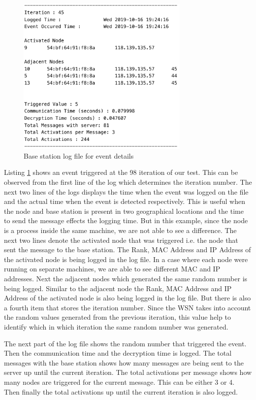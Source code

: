 \documentclass[conference]{IEEEtran}
\begin{document}
	\begin{figure}[!h]
		\centering
		\includegraphics[width=3.3in,keepaspectratio]{logE}
		\caption{Base station log file for event details}
		\label{lst:log1}
	\end{figure}	
	Listing \ref{lst:log1} shows an event triggered at the 98 iteration of our test. This can be observed from the first line of the log which determines the iteration number. The next two lines of the logs displays the time when the event was logged on the file and the actual time when the event is detected respectively. This is useful when the node and base station is present in two geographical locations and the time to send the message effects the logging time. But in this example, since the node is a process inside the same machine, we are not able to see a difference. The next two lines denote the activated node that was triggered i.e. the node that sent the message to the base station. The Rank, MAC Address and IP Address of the activated node is being logged in the log file. In a case where each node were running on separate machines, we are able to see different MAC and IP addresses. Next the adjacent nodes which generated the same random number is being logged. Similar to the adjacent node the Rank, MAC Address and IP Address of the activated node is also being logged in the log file. But there is also a fourth item that stores the iteration number. Since the WSN takes into account the random values generated from the previous iteration, this value help to identify which in which iteration the same random number was generated.
	
	The next part of the log file shows the random number that triggered the event. Then the communication time and the decryption time is logged. The total messages with the base station shows how many messages are being sent to the server up until the current iteration. The total activations per message shows how many nodes are triggered for the current message. This can be either 3 or 4. Then finally the total activations up until the current iteration is also logged.
	
\end{document}
